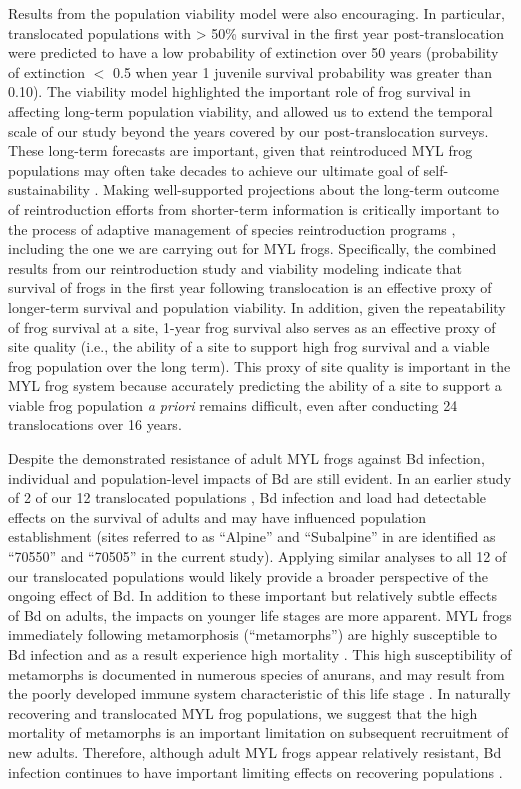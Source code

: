 \documentclass[9pt,twocolumn,twoside,lineno]{pnas-new}
\begin{document}
Results from the population viability model were also encouraging. In
particular, translocated populations with \textgreater{} 50\% survival
in the first year post-translocation were predicted to have a low
probability of extinction over 50 years (probability of extinction \(<\)
0.5 when year 1 juvenile survival probability was greater than 0.10).
The viability model highlighted the important role of frog survival in
affecting long-term population viability, and allowed us to extend the
temporal scale of our study beyond the years covered by our
post-translocation surveys. These long-term forecasts are important,
given that reintroduced MYL frog populations may often take decades to
achieve our ultimate goal of self-sustainability \citep{joseph2018}.
Making well-supported projections about the long-term outcome of
reintroduction efforts from shorter-term information is critically
important to the process of adaptive management of species
reintroduction programs \citep{seddon2007}, including the one we are
carrying out for MYL frogs. Specifically, the combined results from our
reintroduction study and viability modeling indicate that survival of
frogs in the first year following translocation is an effective proxy of
longer-term survival and population viability. In addition, given the
repeatability of frog survival at a site, 1-year frog survival also
serves as an effective proxy of site quality (i.e., the ability of a
site to support high frog survival and a viable frog population over the
long term). This proxy of site quality is important in the MYL frog
system because accurately predicting the ability of a site to support a
viable frog population \emph{a priori} remains difficult, even after
conducting 24 translocations over 16 years.

Despite the demonstrated resistance of adult MYL frogs against Bd
infection, individual and population-level impacts of Bd are still
evident. In an earlier study of 2 of our 12 translocated populations
\citep{joseph2018}, Bd infection and load had detectable effects on the
survival of adults and may have influenced population establishment
(sites referred to as ``Alpine'' and ``Subalpine'' in \citep{joseph2018}
are identified as ``70550'' and ``70505'' in the current study).
Applying similar analyses to all 12 of our translocated populations
would likely provide a broader perspective of the ongoing effect of Bd.
In addition to these important but relatively subtle effects of Bd on
adults, the impacts on younger life stages are more apparent. MYL frogs
immediately following metamorphosis (``metamorphs'') are highly
susceptible to Bd infection \citep{ellison2019} and as a result
experience high mortality \citep{rachowicz2006}. This high
susceptibility of metamorphs is documented in numerous species of
anurans, and may result from the poorly developed immune system
characteristic of this life stage \citep{humphries2022}. In naturally
recovering and translocated MYL frog populations, we suggest that the
high mortality of metamorphs is an important limitation on subsequent
recruitment of new adults. Therefore, although adult MYL frogs appear
relatively resistant, Bd infection continues to have important limiting
effects on recovering populations \citep[see also][]{hollanders2022}.
\end{document}

